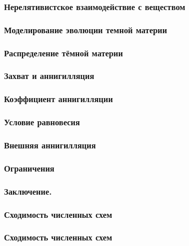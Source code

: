 	\begin{frame}
		\frametitle{Нерелятивистское взаимодействие с веществом}
		
	\end{frame}
	
	\begin{frame}
		\frametitle{Моделирование эволюции темной материи}
		
	\end{frame}
	
	

	
	\begin{frame}
		\frametitle{Распределение тёмной материи}
		
	\end{frame}
	\begin{frame}
		\frametitle{Захват и аннигилляция}
		
	\end{frame}
	
	
	\begin{frame}
		\frametitle{Коэффициент аннигилляции}
		
	\end{frame}
	
	
	\begin{frame}
		\frametitle{Условие равновесия}
		
	\end{frame}
	
	\begin{frame}
		\frametitle{Внешняя аннигилляция}
		
	\end{frame}
	
	\begin{frame}
		\frametitle{Ограничения}
		
	\end{frame}
	
	\begin{frame}
		\frametitle{Заключение.}
		
	\end{frame}
	\begin{frame}
		
	\end{frame}
	
	\begin{frame}
		\frametitle{Сходимость численных схем}
		
	\end{frame}
	\begin{frame}
		\frametitle{Сходимость численных схем}
		
	\end{frame}
 

